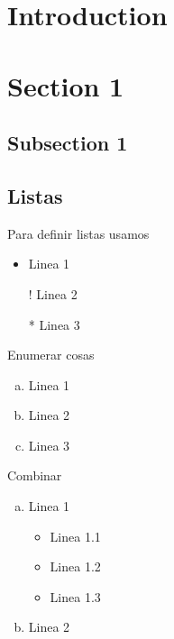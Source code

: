 \section{Introduction}\label{sec:intro}
\blindtext

\section{Section 1}\label{sec:subintro}
\blindtext

\subsection{Subsection 1}
\blindtext

\subsection{Listas}

Para definir listas usamos

\begin{itemize}
    \item Linea 1
    \item[!] Linea 2
    \item[*] Linea 3
\end{itemize}

Enumerar cosas

\begin{enumerate}[a)]
    \item Linea 1
    \item Linea 2
    \item Linea 3
\end{enumerate}

Combinar

\begin{enumerate}[a.]
    \item Linea 1
    \begin{itemize}
        \item Linea 1.1
        \item Linea 1.2
        \item Linea 1.3
    \end{itemize}
    \item Linea 2
\end{enumerate}
